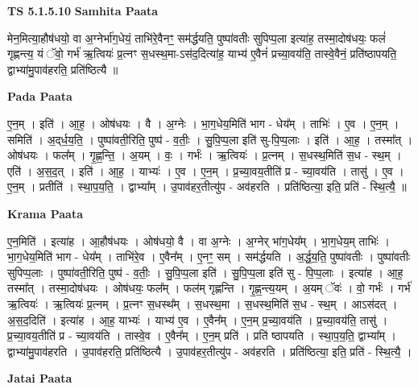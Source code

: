 \documentclass[17pt]{extarticle}
\begin{document}
\textbf{TS 5.1.5.10 } \newline
\textbf{Samhita Paata} \newline

मेन॒मित्या॒हौष॑धयो॒ वा अ॒ग्नेर्भा॑ग॒धेयं॒ ताभि॑रे॒वैनꣳ॒॒ सम॑र्द्धयति॒ पुष्पा॑वतीः सुपिप्प॒ला इत्या॑ह॒ तस्मा॒दोष॑धयः॒ फलं॑ गृह्णन्त्य॒ यं ॅवो॒ गर्भ॑ ऋ॒त्वियः॑ प्र॒त्नꣳ स॒धस्थ॒मा-ऽस॑द॒दित्या॑ह॒ याभ्य॑ ए॒वैनं॑ प्रच्या॒वय॑ति॒ तास्वे॒वैनं॒ प्रति॑ष्ठापयति॒ द्वाभ्या॑मु॒पाव॑हरति॒ प्रति॑ष्ठित्यै ॥ \newline

\textbf{Pada Paata} \newline

ए॒न॒म् । इति॑ । आ॒ह॒ । ओष॑धयः । वै । अ॒ग्नेः । भा॒ग॒धेय॒मिति॑ भाग - धेय᳚म् । ताभिः॑ । ए॒व । ए॒न॒म् । समिति॑ । अ॒द्‌र्ध॒य॒ति॒ । पुष्पा॑वती॒रिति॒ पुष्प॑ - व॒तीः॒ । सु॒पि॒प्प॒ला इति॑ सु-पि॒प्प॒लाः । इति॑ । आ॒ह॒ । तस्मा᳚त् । ओष॑धयः । फल᳚म् । गृ॒ह्ण॒न्ति॒ । अ॒यम् । वः॒ । गर्भः॑ । ऋ॒त्वियः॑ । प्र॒त्नम् । स॒धस्थ॒मिति॑ स॒ध - स्थ॒म् । एति॑ । अ॒स॒द॒त् । इति॑ । आ॒ह॒ । याभ्यः॑ । ए॒व । ए॒न॒म् । प्र॒च्या॒वय॒तीति॑ प्र - च्या॒वय॑ति । तासु॑ । ए॒व । ए॒न॒म् । प्रतीति॑ । स्था॒प॒य॒ति॒ । द्वाभ्या᳚म् । उ॒पाव॑हर॒तीत्यु॑प - अव॑हरति । प्रति॑ष्ठित्या॒ इति॒ प्रति॑ - स्थि॒त्यै॒ ॥  \newline


\textbf{Krama Paata} \newline

ए॒न॒मिति॑ । इत्या॑ह । आ॒हौष॑धयः । ओष॑धयो॒ वै । वा अ॒ग्नेः । अ॒ग्नेर् भा॑ग॒धेय᳚म् । भा॒ग॒धेय॒म् ताभिः॑ । भा॒ग॒धेय॒मिति॑ भाग - धेय᳚म् । ताभि॑रे॒व । ए॒वैन᳚म् । ए॒नꣳ॒॒ सम् । सम॑र्द्धयति । अ॒र्द्ध॒य॒ति॒ पुष्पा॑वतीः । पुष्पा॑वतीः सुपिप्प॒लाः । पुष्पा॑वती॒रिति॒ पुष्प॑ - व॒तीः॒ । सु॒पि॒प्प॒ला इति॑ । सु॒पि॒प्प॒ला इति॑ सु - पि॒प्प॒लाः । इत्या॑ह । आ॒ह॒ तस्मा᳚त् । तस्मा॒दोष॑धयः । ओष॑धयः॒ फल᳚म् । फल॑म् गृह्णन्ति । गृ॒ह्ण॒न्त्य॒यम् । अ॒यम् ॅवः॑ । वो॒ गर्भः॑ । गर्भ॑ ऋ॒त्वियः॑ । ऋ॒त्वियः॑ प्र॒त्नम् । प्र॒त्नꣳ स॒धस्थ᳚म् । स॒धस्थ॒मा । स॒धस्थ॒मिति॑ स॒ध - स्थ॒म् । आऽस॑दत् । अ॒स॒द॒दिति॑ । इत्या॑ह । आ॒ह॒ याभ्यः॑ । याभ्य॑ ए॒व । ए॒वैन᳚म् । ए॒न॒म् प्र॒च्या॒वय॑ति । प्र॒च्या॒वय॑ति॒ तासु॑ । प्र॒च्या॒वय॒तीति॑ प्र - च्या॒वय॑ति । तास्वे॒व । ए॒वैन᳚म् । ए॒न॒म् प्रति॑ । प्रति॑ ष्ठापयति । स्था॒प॒य॒ति॒ द्वाभ्या᳚म् । द्वाभ्या॑मु॒पाव॑हरति । उ॒पाव॑हरति॒ प्रति॑ष्ठित्यै । उ॒पाव॑हर॒तीत्यु॑प - अव॑हरति । प्रति॑ष्ठित्या॒ इति॒ प्रति॑ - स्थि॒त्यै॒ । \newline

\textbf{Jatai Paata} \newline
\end{document}
